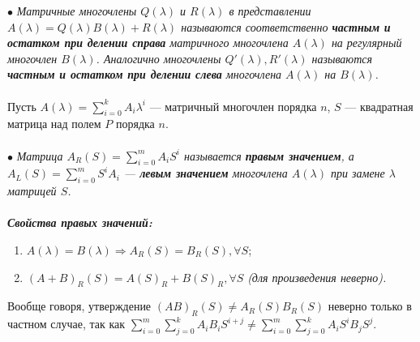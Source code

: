 $\bullet$ \textit{Матричные многочлены $Q(\lambda)$ и $R(\lambda)$ в представлении $A(\lambda) = Q(\lambda)B(\lambda) + R(\lambda)$ называются соответственно \textbf{частным и остатком при делении справа} матричного многочлена $A(\lambda)$ на регулярный многочлен $B(\lambda)$. Аналогично многочлены $Q'(\lambda),R'(\lambda)$ называются \textbf{частным и остатком при делении слева} многочлена $A(\lambda)$ на $B(\lambda)$.}\\\\
Пусть $A(\lambda) = \sum\limits_{i=0}^kA_i\lambda^i$ --- матричный многочлен порядка $n$, $S$ --- квадратная матрица над полем $P$ порядка $n$.\\\\
$\bullet$ \textit{Матрица $A_R(S) = \sum\limits_{i=0}^mA_iS^i$ называется \textbf{правым значением}, а $ A_L(S) = \sum\limits_{i=0}^mS^iA_i$ --- \textbf{левым значением} многочлена $A(\lambda)$ при замене $\lambda$ матрицей $S$.}\\\\
\textit{\textbf{Свойства правых значений:}}\begin{enumerate}
	\item $A(\lambda) = B(\lambda) \Rightarrow A_R(S) = B_R(S), \forall S$;
	\item  $(A+B)_R(S) = A(S)_R + B(S)_R, \forall S$ \textit{(для произведения неверно).}
\end{enumerate}
Вообще говоря, утверждение $(AB)_R(S) \ne A_R(S)B_R(S)$ неверно только в частном случае, так как $\sum\limits_{i = 0}^m\sum\limits_{j = 0}^kA_iB_iS^{i+j} \ne \sum\limits_{i = 0}^m\sum\limits_{j = 0}^kA_iS^iB_jS^j$.
